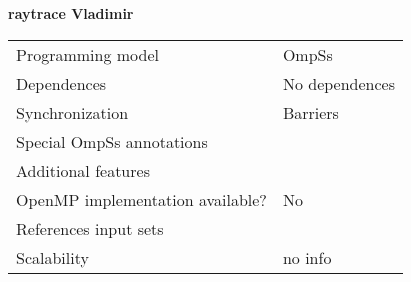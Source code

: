 \section*{}
\label{raytrace_vladimir}
\centering
\Huge
\textbf{raytrace Vladimir}

\begin{table}[h!]
  \large
  \centering
  \begin{tabular}{|l|l|}
    \hline
    Programming model                & OmpSs \\
    Dependences                      & No dependences \\
    Synchronization                  & Barriers \\
    Special OmpSs annotations        &  \\
    Additional features              &  \\
    OpenMP implementation available? & No \\
    References input sets            &  \\
    Scalability                      & no info \\
    \hline
  \end{tabular}
\end{table}

\newpage
